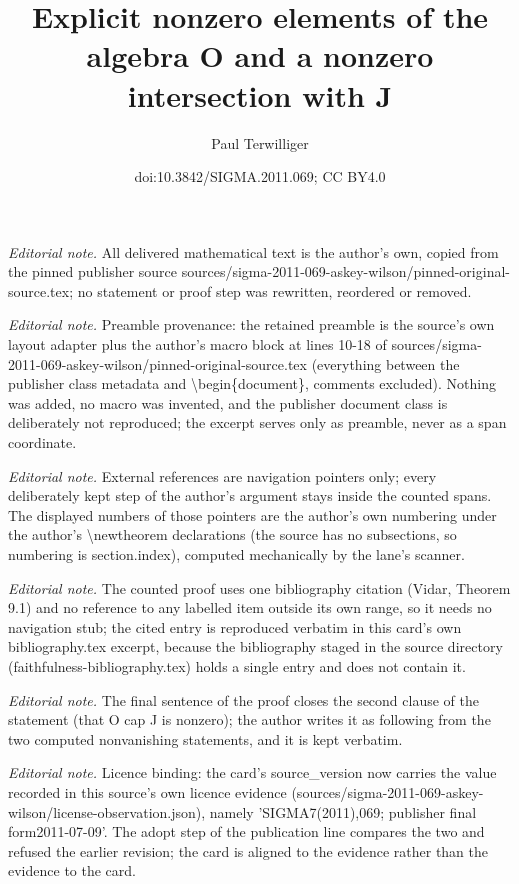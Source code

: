 \documentclass[10pt,a4paper]{amsart}
\title{Explicit nonzero elements of the algebra O and a nonzero intersection with J}
\author{Paul Terwilliger}
\date{doi:10.3842/SIGMA.2011.069; CC BY4.0}
\begin{document}
\maketitle
\noindent\textit{Editorial note.} All delivered mathematical text is the author's own, copied from the pinned publisher source sources/sigma-2011-069-askey-wilson/pinned-original-source.tex; no statement or proof step was rewritten, reordered or removed.\par\medskip
\noindent\textit{Editorial note.} Preamble provenance: the retained preamble is the source's own layout adapter plus the author's macro block at lines 10-18 of sources/sigma-2011-069-askey-wilson/pinned-original-source.tex (everything between the publisher class metadata and \textbackslash{}begin\{document\}, comments excluded). Nothing was added, no macro was invented, and the publisher document class is deliberately not reproduced; the excerpt serves only as preamble, never as a span coordinate.\par\medskip
\noindent\textit{Editorial note.} External references are navigation pointers only; every deliberately kept step of the author's argument stays inside the counted spans. The displayed numbers of those pointers are the author's own numbering under the author's \textbackslash{}newtheorem declarations (the source has no subsections, so numbering is section.index), computed mechanically by the lane's scanner.\par\medskip
\noindent\textit{Editorial note.} The counted proof uses one bibliography citation (Vidar, Theorem 9.1) and no reference to any labelled item outside its own range, so it needs no navigation stub; the cited entry is reproduced verbatim in this card's own bibliography.tex excerpt, because the bibliography staged in the source directory (faithfulness-bibliography.tex) holds a single entry and does not contain it.\par\medskip
\noindent\textit{Editorial note.} The final sentence of the proof closes the second clause of the statement (that O cap J is nonzero); the author writes it as following from the two computed nonvanishing statements, and it is kept verbatim.\par\medskip
\noindent\textit{Editorial note.} Licence binding: the card's source\_version now carries the value recorded in this source's own licence evidence (sources/sigma-2011-069-askey-wilson/license-observation.json), namely 'SIGMA7(2011),069; publisher final form2011-07-09'. The adopt step of the publication line compares the two and refused the earlier revision; the card is aligned to the evidence rather than the evidence to the card.\par\medskip
\end{document}
